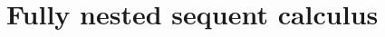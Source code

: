 \documentclass[twoside]{aiml20}
\newcommand{\B}{\mathcal{B}}
\newcommand{\Left}{\mathcal{L}}
\newcommand{\Right}{\mathcal{R}}
\newcommand*{\rel}{R}
\newcommand*{\rn}[1]  {\ensuremath{\mathsf{#1}}}
\newcommand*{\fm}[1]{#1}%
\newcommand*{\lb}[1]{#1}%
\newcommand*{\labels}[2]{\lb{#1}\mathord{:}\fm{#2}}
\newcommand*{\lab}{\mathsf{lab}}
\newcommand*{\DIA}{\mathord{\Diamond}}
\newcommand{\SEQ}{\Rightarrow}
\newcommand*{\labrn}[2][]  {\rn{#2}_{#1}}%
\newcommand*{\rlabrn}[2][]  {\rn{#2}_\rn{R#1}}%
\newcommand*{\llabrn}[2][]  {\rn{#2}_\rn{L#1}}%
\begin{document}
%
%
%



\section{Fully nested sequent calculus}\label{sec:nested}
\end{document}
